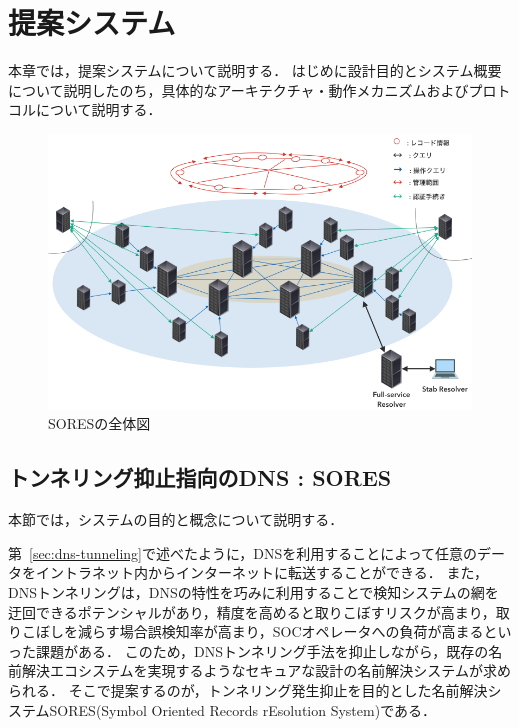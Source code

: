 \section{提案システム}
本章では，提案システムについて説明する．
はじめに設計目的とシステム概要について説明したのち，具体的なアーキテクチャ・動作メカニズムおよびプロトコルについて説明する．

\begin{figure}[h]
 \centering
 \label{fig:abstruct-SORES-architecture}
 \includegraphics[scale=0.5]{figure/abstruct-architecture.png}
 \caption{SORESの全体図}
\end{figure}


\subsection{トンネリング抑止指向のDNS : SORES}
本節では，システムの目的と概念について説明する．

第~\ref{sec:dns-tunneling}で述べたように，DNSを利用することによって任意のデータをイントラネット内からインターネットに転送することができる．
また，DNSトンネリングは，DNSの特性を巧みに利用することで検知システムの網を迂回できるポテンシャルがあり，精度を高めると取りこぼすリスクが高まり，取りこぼしを減らす場合誤検知率が高まり，SOCオペレータへの負荷が高まるといった課題がある．
このため，DNSトンネリング手法を抑止しながら，既存の名前解決エコシステムを実現するようなセキュアな設計の名前解決システムが求められる．
そこで提案するのが，トンネリング発生抑止を目的とした名前解決システムSORES(Symbol Oriented Records rEsolution System)である．

